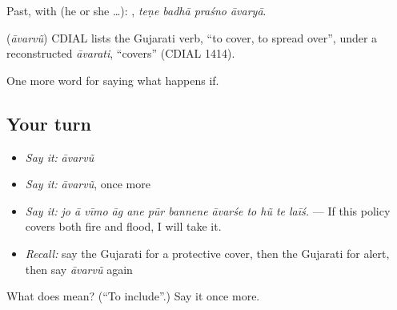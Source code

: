 Past, with  (he or she …):    , \emph{teṇe badhā praśno āvaryā}.

\begin{cousinweb}
\textbf{} (\emph{āvarvũ}) CDIAL lists the Gujarati verb, \textquotedblleft{}to cover, to spread over\textquotedblright{}, under a reconstructed \emph{āvarati}, \textquotedblleft{}covers\textquotedblright{} (CDIAL 1414).
\end{cousinweb}

\begin{grammarlens}[title={What you've built}]
One more word for saying what happens if.
\end{grammarlens}

\subsection*{Your turn}
\begin{itemize}
\raggedright
  \item \emph{Say it:} \emph{āvarvũ}
  \item \emph{Say it:} \emph{āvarvũ}, once more
  \item \emph{Say it:} \emph{jo ā vīmo āg ane pūr bannene āvarśe to hũ te laīś.} — If this policy covers both fire and flood, I will take it.
  \item \emph{Recall:} say the Gujarati for a protective cover, then the Gujarati for alert, then say \emph{āvarvũ} again
\end{itemize}

\begin{tcolorbox}[breakable,colback=teal!4,colframe=teal!35!black,title={Before you move on}]
What does  mean? (\textquotedblleft{}To include\textquotedblright{}.) Say it once more.
\end{tcolorbox}
